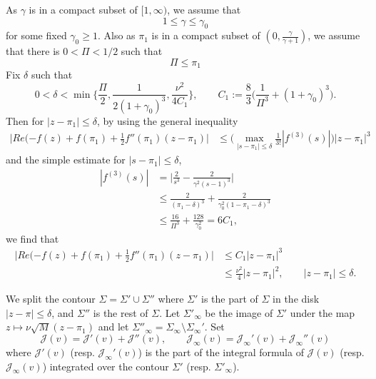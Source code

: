 \documentclass[11pt]{article}
\begin{document}
As $\gamma$ is in a compact subset of $[1,\infty)$, we assume that
\begin{equation}
  1\le \gamma\le \gamma_0
\end{equation}
for some fixed $\gamma_0\ge 1$. Also as $\pi_1$ is in a compact
subset of $(0,\frac{\gamma}{\gamma+1})$, we assume that there is
$0<\Pi<1/2$ such that
\begin{equation}
  \Pi\le \pi_1
\end{equation}
Fix $\delta$ such that
\begin{equation}
  0< \delta<\min \biggl\{ \frac{\Pi}2, \frac1{2(1+\gamma_0)^3}, \frac{\nu^2}{4C_1} \biggr\}, \qquad C_1:=
  \frac83\biggl( \frac1{\Pi^3}+(1+\gamma_0)^3\biggr) .
\end{equation}
Then for $|z-\pi_1|\le \delta$, by using the general inequality
\begin{equation}
\begin{split}
  \bigl| Re(-f(z)+f(\pi_1)+\frac12f''(\pi_1)(z-\pi_1) \bigr|
  &\le \biggl( \max_{|s-\pi_1|\le \delta} \frac1{3!}|f^{(3)}(s)|
  \biggr) |z-\pi_1|^3
\end{split}
\end{equation}
and the simple estimate for $|s-\pi_1|\le \delta$,
\begin{equation}
\begin{split}
  |f^{(3)}(s)| &= \biggl|
  \frac2{s^3}-\frac2{\gamma^2(s-1)^3}\biggr| \\
  &\le \frac2{(\pi_1-\delta)^3}+
  \frac2{\gamma_0^2(1-\pi_1-\delta)^3} \\
  &\le \frac{16}{\Pi^3}+ \frac{128}{\gamma_0^2} = 6C_1,
\end{split}
\end{equation}
we find that
\begin{equation}\label{eq:RefGaussJ}
\begin{split}
  \bigl| Re(-f(z)+f(\pi_1)+\frac12f''(\pi_1)(z-\pi_1) \bigr|
  &\le C_1 |z-\pi_1|^3 \\
  &\le \frac{\nu^2}{4} |z-\pi_1|^2, \qquad |z-\pi_1|\le \delta.
\end{split}
\end{equation}




 We split the contour
$\Sigma=\Sigma'\cup\Sigma''$ where $\Sigma'$ is the part of
$\Sigma$ in the disk $|z-\pi|\le \delta$, and $\Sigma''$ is the
rest of $\Sigma$. Let $\Sigma'_\infty$ be the image of $\Sigma'$
under the map $z\mapsto \nu\sqrt{M}(z-\pi_1)$ and let
$\Sigma''_\infty=\Sigma_\infty\setminus\Sigma_\infty'$. Set
\begin{equation}
  \mathcal{J}(v)=\mathcal{J}'(v)+\mathcal{J}''(v),
  \qquad \mathcal{J}_\infty(v)=\mathcal{J}_\infty'(v)+\mathcal{J}_\infty''(v)
\end{equation}
where $\mathcal{J}'(v)$ (resp. $\mathcal{J}_\infty'(v)$) is the
part of the integral formula of $\mathcal{J}(v)$ (resp.
$\mathcal{J}_\infty(v)$) integrated over the contour $\Sigma'$
(resp. $\Sigma'_\infty$).
\end{document}
